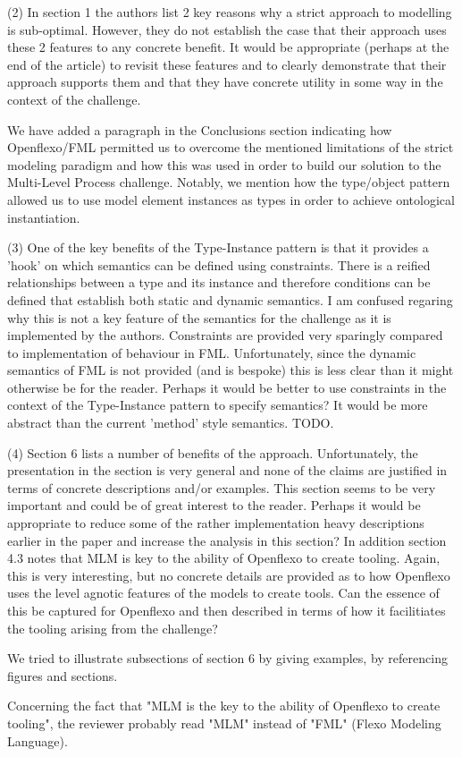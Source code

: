 \documentclass[10pt]{article}
\begin{document}
\begin{response}{(2) In section 1 the authors list 2 key reasons why a strict approach to modelling is sub-optimal. However, they do not establish the case that their approach uses these 2 features to any concrete benefit. It would be appropriate (perhaps at the end of the article) to revisit these features and to clearly demonstrate that their approach supports them and that they have concrete utility in some way in the context of the challenge.} 

We have added a paragraph in the Conclusions section indicating how Openflexo/FML permitted us to overcome the mentioned limitations of the strict modeling paradigm and how this was used in order to build our solution to the Multi-Level Process challenge. Notably, we mention how the type/object pattern allowed us to use model element instances as types in order to achieve ontological instantiation.
\end{response}

\begin{response}{(3) One of the key benefits of the Type-Instance pattern is that it provides a 'hook' on which semantics can be defined using constraints. There is a reified relationships between a type and its instance and therefore conditions can be defined that establish both static and dynamic semantics. I am confused regaring why this is not a key feature of the semantics for the challenge as it is implemented by the authors. Constraints are provided very sparingly compared to implementation of behaviour in FML. Unfortunately, since the dynamic semantics of FML is not provided (and is bespoke) this is less clear than it might otherwise be for the reader. Perhaps it would be better to use constraints in the context of the Type-Instance pattern to specify semantics? It would be more abstract than the current 'method' style semantics.} 
TODO.
\end{response}

\begin{response}{(4) Section 6 lists a number of benefits of the approach. Unfortunately, the presentation in the section is very general and none of the claims are justified in terms of concrete descriptions and/or examples. This section seems to be very important and could be of great interest to the reader. Perhaps it would be appropriate to reduce some of the rather implementation heavy descriptions earlier in the paper and increase the analysis in this section? In addition section 4.3 notes that MLM is key to the ability of Openflexo to create tooling. Again, this is very interesting, but no concrete details are provided as to how Openflexo uses the level agnotic features of the models to create tools. Can the essence of this be captured for Openflexo and then described in terms of how it facilitiates the tooling arising from the challenge?} 

We tried to illustrate subsections of section 6 by giving examples, by referencing figures and sections.

Concerning the fact that "MLM is the key to the ability of Openflexo to create tooling", the reviewer probably read "MLM" instead of "FML" (Flexo Modeling Language).
\end{response}
\end{document}
